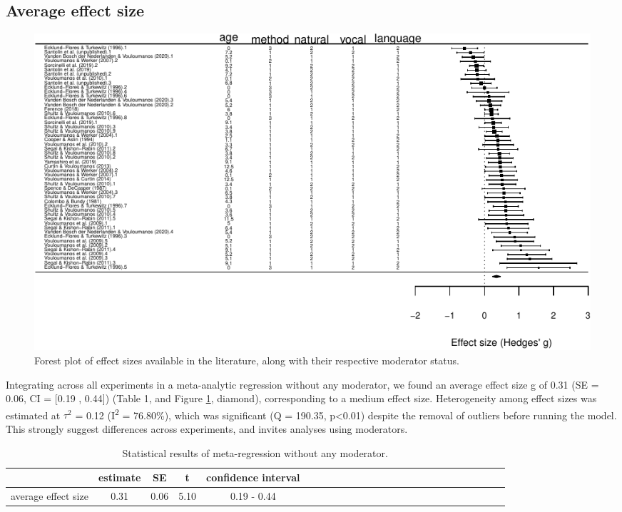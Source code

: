 \documentclass[man]{apa6}
\begin{document}
\hypertarget{average-effect-size}{%
\subsection{Average effect size}\label{average-effect-size}}

\begin{figure}
\centering
\includegraphics{MA_speech_pref_files/figure-latex/forest-1.pdf}
\caption{\label{fig:forest}Forest plot of effect sizes available in the literature, along with their respective moderator status.}
\end{figure}

Integrating across all experiments in a meta-analytic regression without any moderator, we found an average effect size g of 0.31 (SE = 0.06, CI = {[}0.19 , 0.44{]}) (Table 1, and Figure \ref{fig:forest}, diamond), corresponding to a medium effect size.
Heterogeneity among effect sizes was estimated at \(\tau^2\) = 0.12 (I\textsuperscript{2} = 76.80\%), which was significant (Q = 190.35, p\textless0.01) despite the removal of outliers before running the model. This strongly suggest differences across experiments, and invites analyses using moderators.

\begin{table}[tbp]
\begin{center}
\begin{threeparttable}
\caption{\label{tab:Table1}Statistical results of meta-regression without any moderator.}
\begin{tabular}{lcccclcccclcccclcccclcccc}
\toprule
 & estimate & SE & t & confidence interval\\
\midrule
average effect size & 0.31 & 0.06 & 5.10 & 0.19 - 0.44\\
\bottomrule
\end{tabular}
\end{threeparttable}
\end{center}
\end{table}
\end{document}
